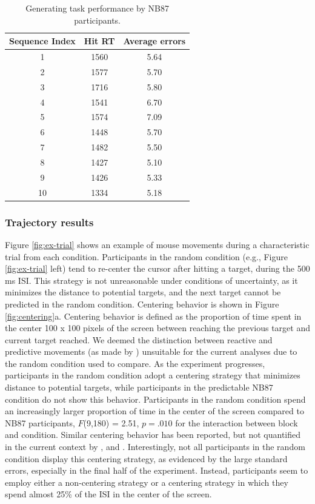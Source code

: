 \documentclass[man,floatsintext]{apa6}
\begin{document}
\begin{table}[h]
\begin{center} 
\caption{Generating task performance by NB87 participants.} 
\label{test-table} 
\vskip 0.12in
\begin{tabular}{c c c} 
\hline
Sequence Index  &  Hit RT  &  Average errors  \\ %
\hline
1  &  1560 &  5.64  \\
2  &  1577 &  5.70  \\
3  &  1716 &  5.80  \\
4  &  1541 &  6.70  \\ 
5  &  1574 &  7.09  \\ 
6  &  1448 &  5.70  \\ 
7  &  1482 &  5.50  \\ 
8  &  1427 &  5.10  \\ 
9  &  1426 &  5.33  \\ 
10 & 1334 &  5.18  \\
\hline
\end{tabular} 
\end{center} 
\end{table} 


\subsubsection{Trajectory results}

Figure \ref{fig:ex-trial} shows an example of mouse movements during a characteristic trial from each condition. Participants in the random condition (e.g., Figure \ref{fig:ex-trial} left) tend to re-center the cursor after hitting a target, during the 500 ms ISI. This strategy is not unreasonable under conditions of uncertainty, as it minimizes the distance to potential targets, and the next target cannot be predicted in the random condition. Centering behavior is shown in Figure \ref{fig:centering}a. Centering behavior is defined as the proportion of time spent in the center 100 x 100 pixels of the screen between reaching the previous target and current target reached. We deemed the distinction between reactive and predictive movements (as made by ) unsuitable for the current analyses due to the random condition used to compare. As the experiment progresses, participants in the random condition adopt a centering strategy that minimizes distance to potential targets, while participants in the predictable NB87 condition do not show this behavior. Participants in the random condition spend an increasingly larger proportion of time in the center of the screen compared to NB87 participants, $F$(9,180) = 2.51, $p = .010$ for the interaction between block and condition. Similar centering behavior has been reported, but not quantified in the current context by , and . Interestingly, not all participants in the random condition display this centering strategy, as evidenced by the large standard errors, especially in the final half of the experiment. Instead, participants seem to employ either a non-centering strategy or a centering strategy in which they spend almost 25\% of the ISI in the center of the screen.
\end{document}
